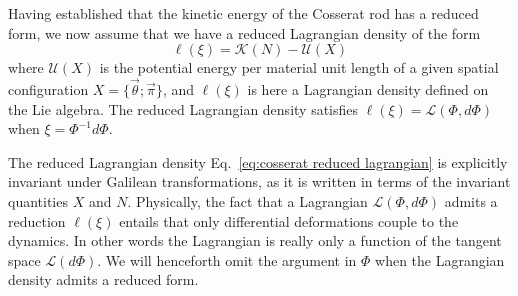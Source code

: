 Having established that the kinetic energy of the Cosserat rod has a reduced form, we now assume that we have a reduced Lagrangian density of the form
\begin{equation} \label{eq:cosserat reduced lagrangian}
\ell(\xi) = \mathcal{K}(N) - \mathcal{U}(X)
\end{equation}
where $\mathcal{U}(X)$ is the potential energy per material unit length of a given spatial configuration $X = \{ \vec{\theta} ; \vec{\pi} \}$, and $\ell(\xi)$ is here a Lagrangian density defined on the Lie algebra. The reduced Lagrangian density satisfies $\ell(\xi) = \mathcal{L}(\Phi, d\Phi)$ when $\xi = \Phi^{-1} d \Phi$. 

The reduced Lagrangian density Eq.~\ref{eq:cosserat reduced lagrangian} is explicitly invariant under Galilean transformations, as it is written in terms of the invariant quantities $X$ and $N$. Physically, the fact that a Lagrangian $\mathcal{L}(\Phi, d\Phi)$ admits a reduction $\ell(\xi)$ entails that only differential deformations couple to the dynamics. In other words the Lagrangian is really only a function of the tangent space $\mathcal{L}(d \Phi)$. We will henceforth omit the argument in $\Phi$ when the Lagrangian density admits a reduced form.



